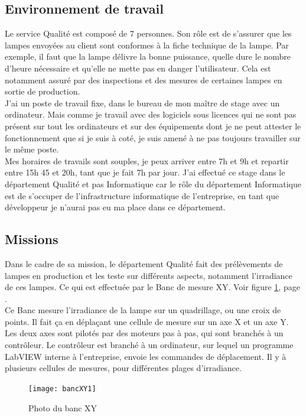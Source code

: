 \documentclass[12pt]{article}
\begin{document}
\subsection{Environnement de travail}
Le service Qualité est composé de 7 personnes. 
Son rôle est de s'assurer que les lampes envoyées au client sont conformes à la fiche technique de la lampe.
Par exemple, il faut que la lampe délivre la bonne puissance, quelle dure le nombre d'heure nécessaire et qu'elle ne mette pas en danger l'utilisateur.
Cela est notamment assuré par des inspections et des mesures de certaines lampes en sortie de production.\\
J'ai un poste de travail fixe, dans le bureau de mon maître de stage avec un ordinateur.
Mais comme je travail avec des logiciels sous licences qui ne sont pas présent sur tout les ordinateurs et sur des équipements dont je ne peut attester le fonctionnement que si je suis à coté, je suis amené à ne pas toujours travailler sur le même poste.\\
Mes horaires de travails sont souples, je peux arriver entre 7h et 9h et repartir entre 15h 45 et 20h, tant que je fait 7h par jour.
J'ai effectué ce stage dans le département Qualité et pas Informatique car le rôle du département Informatique est de s'occuper de l'infrastructure informatique de l'entreprise, en tant que développeur je n'aurai pas eu ma place dans ce département.
\newpage

\subsection{Missions}


Dans le cadre de sa mission, le département Qualité fait des prélèvements de lampes en production et les teste sur différents aspects, notamment l'\gls{irradiance} de ces lampes.
Ce qui est effectuée par le Banc de mesure XY.
Voir figure \ref{fig:bancXY1}, page \pageref{fig:bancXY1}.\\
Ce Banc mesure l'irradiance de la lampe sur un quadrillage, ou une croix de points.
Il fait ça en déplaçant une cellule de mesure sur un axe X et un axe Y.
Les deux axes sont pilotés par des moteurs pas à pas, qui sont branchés à un contrôleur.
Le contrôleur est branché à un ordinateur, sur lequel un programme LabVIEW interne à l'entreprise, envoie les commandes de déplacement.
Il y à plusieurs cellules de mesures, pour différentes plages d'irradiance.\\
\begin{figure}[htb]
	\centering
	\texttt{[image: bancXY1]}
	\caption{Photo du banc XY}
	\label{fig:bancXY1}
\end{figure}
\end{document}
